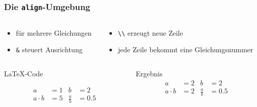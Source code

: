 \begin{frame}[fragile]
    \frametitle{Die \texttt{align}-Umgebung}
    \begin{columns}[t]
        \begin{column}{0.35\textwidth}
            \begin{itemize}
                \item für mehrere Gleichungen
                \item \texttt{\&} steuert Ausrichtung
            \end{itemize}
        \end{column}
        \begin{column}{0.6\textwidth}
            \begin{itemize}
                \item \texttt{\textbackslash\textbackslash} erzeugt neue Zeile
                \item jede Zeile bekommt eine Gleichungsnummer
            \end{itemize}
        \end{column}
    \end{columns}
    \vfill
    \begin{columns}[T]
        \begin{column}{0.65\textwidth}
            \begin{block}{\LaTeX-Code}
                \begin{lstverbatim}
                \begin{align}
                    a &= 1       & b&=2 \\
                    a\cdot b &=5 & \frac{a}{b} &= \num{0,5}
                \end{align}
                \end{lstverbatim}
            \end{block}
        \end{column}
        \begin{column}{0.3\textwidth}
            \begin{block}{Ergebnis}
                \begin{align}
                    a &= 2       & b&=2 \\
                    a\cdot b &=2 & \frac{a}{b} &= \num{0,5}
                \end{align}
            \end{block}
        \end{column}
    \end{columns}
\end{frame}

